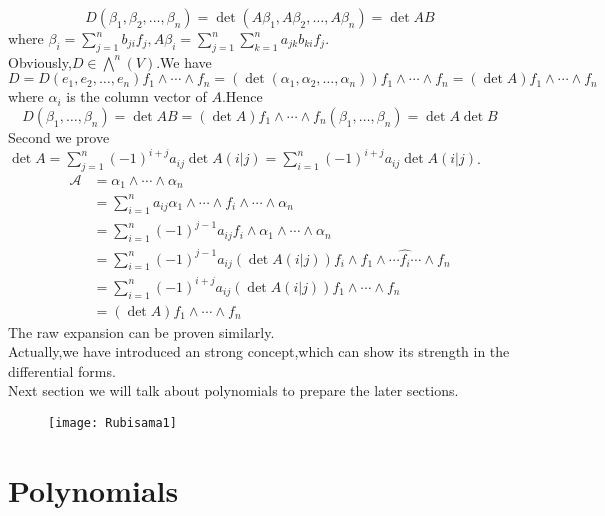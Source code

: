 \documentclass{article}
\begin{document}
\[D(\beta_1,\beta_2,\dots,\beta_n)=\det (A\beta_1,A\beta_2,\dots,A\beta_n)=\det AB\]
where $\beta_i=\sum\limits_{j=1}^nb_{ji}f_j,A\beta_i=\sum\limits_{j=1}^n\sum\limits_{k=1}^na_{jk}b_{ki}f_j$.\\
Obviously,$D\in\bigwedge^n(V)$.We have
\[D=D(e_1,e_2,\dots,e_n)f_1\wedge\cdots\wedge f_n=(\det(\alpha_1,\alpha_2,\dots,\alpha_n))f_1\wedge\cdots\wedge f_n=(\det A)f_1\wedge\cdots\wedge f_n\]
where $\alpha_i$ is the column vector of $A$.Hence
\[D(\beta_1,\dots,\beta_n)=\det AB=(\det A)f_1\wedge\cdots\wedge f_n(\beta_1,\dots,\beta_n)=\det A\det B\]
Second we prove $\det A=\sum\limits_{j=1}^n(-1)^{i+j}a_{ij}\det A(i|j)=\sum\limits_{i=1}^n(-1)^{i+j}a_{ij}\det A(i|j)$.\\
\begin{align*}
	\mathcal{A}&=\alpha_1\wedge\cdots\wedge\alpha_n\\
	&=\sum\limits_{i=1}^na_{ij}\alpha_1\wedge\cdots\wedge f_i\wedge\cdots\wedge\alpha_n\\
	&=\sum\limits_{i=1}^n(-1)^{j-1}a_{ij}f_i\wedge\alpha_1\wedge\cdots\wedge\alpha_n\\
	&=\sum\limits_{i=1}^n(-1)^{j-1}a_{ij}(\det A(i|j))f_i\wedge f_1\wedge\cdots\hat{f_i}\cdots\wedge f_n\\
	&=\sum\limits_{i=1}^n(-1)^{i+j}a_{ij}(\det A(i|j))f_1\wedge\cdots\wedge f_n\\
	&=(\det A)f_1\wedge\cdots\wedge f_n
\end{align*}
The raw expansion can be proven similarly.\\
\indent Actually,we have introduced an strong concept,which can show its strength in the differential forms.\\ 
\indent Next section we will talk about polynomials to prepare the later sections.
\begin{figure}[htbp]
	\centering
	\texttt{[image: Rubisama1]}
\end{figure}
\newpage
\section{Polynomials}\label{4}
\end{document}
